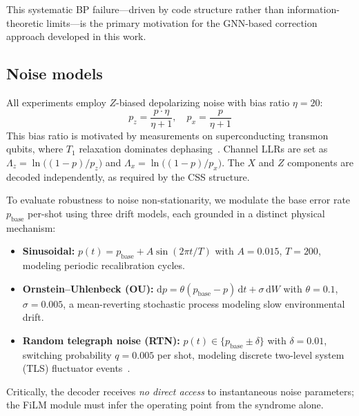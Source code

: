 \documentclass[a4paper,twocolumn,11pt,unpublished,nopdfoutputerror]{quantumarticle}
\newcommand{\llr}{\Lambda}
\begin{document}
This systematic BP failure---driven by code structure rather than information-theoretic limits---is the primary motivation for the GNN-based correction approach developed in this work.

\subsection{Noise models}\label{sec:noise}

All experiments employ $Z$-biased depolarizing noise with bias ratio $\eta = 20$:
\begin{equation}
p_z = \frac{p \cdot \eta}{\eta + 1}, \quad p_x = \frac{p}{\eta + 1}
\label{eq:bias}
\end{equation}
This bias ratio is motivated by measurements on superconducting transmon qubits, where $T_1$ relaxation dominates dephasing~\cite{Tuckett2018Bias,Darmawan2021XZZX}. Channel LLRs are set as $\llr_z = \ln\bigl((1-p)/p_z\bigr)$ and $\llr_x = \ln\bigl((1-p)/p_x\bigr)$. The $X$ and $Z$ components are decoded independently, as required by the CSS structure.

To evaluate robustness to noise non-stationarity, we modulate the base error rate $p_\mathrm{base}$ per-shot using three drift models, each grounded in a distinct physical mechanism:

\begin{itemize}[leftmargin=*,topsep=2pt,itemsep=2pt]
\item \textbf{Sinusoidal:} $p(t) = p_\mathrm{base} + A\sin(2\pi t / T)$ with $A = 0.015$, $T = 200$, modeling periodic recalibration cycles.

\item \textbf{Ornstein--Uhlenbeck (OU):} $\mathrm{d}p = \theta(p_\mathrm{base} - p)\,\mathrm{d}t + \sigma\,\mathrm{d}W$ with $\theta = 0.1$, $\sigma = 0.005$, a mean-reverting stochastic process modeling slow environmental drift.

\item \textbf{Random telegraph noise (RTN):} $p(t) \in \{p_\mathrm{base} \pm \delta\}$ with $\delta = 0.01$, switching probability $q = 0.005$ per shot, modeling discrete two-level system (TLS) fluctuator events~\cite{Klimov2018Fluctuations,Burnett2019Decoherence}.
\end{itemize}

Critically, the decoder receives \emph{no direct access} to instantaneous noise parameters; the FiLM module must infer the operating point from the syndrome alone.
\end{document}
